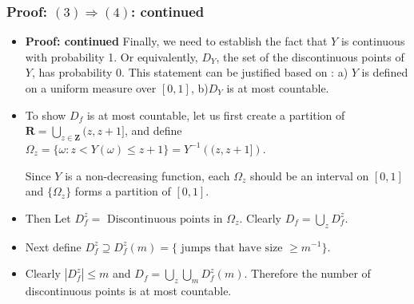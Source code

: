 \documentclass[handout]{beamer}
\begin{document}
\frame
{
  \frametitle{Proof: $(3) \Rightarrow (4)$: continued} 

   \begin{itemize}
          
                     
\item<1-> \textbf{Proof: continued} Finally, we need to establish the fact that $Y$ is continuous with probability 1. Or equivalently, $D_Y$, the set of the discontinuous points of $Y$, has probability 0. This statement can be justified based on : a) $Y$ is defined on a uniform measure over $[0,1]$, b)$D_Y$ is at most countable. 

\item<2-> To show  $D_f$ is at most countable, let us first create a partition of $\mathbf{R}=\bigcup_{z\in \mathbf{Z}} (z, z+1]$, and define $\Omega_z=\{\omega: z<Y(\omega)\leq z+1 \} = Y^{-1}\left( (z,z+1] \right)$. 

Since $Y$ is a non-decreasing function, each $\Omega_z$ should be an interval on $[0,1]$ and $\{\Omega_z\}$ forms a partition of $[0,1]$.

\item<3-> Then Let $D_f^z = \text{ Discontinuous points in } \Omega_z$. Clearly $D_f=\bigcup_z D_f^z$. 

\item<4-> Next define $D_f^z \supseteq D_f^z(m) = \{ \text{ jumps that have size } \ge m^{-1} \}$. 

\item<5-> Clearly $|D_f^z| \le m$ and $D_f = \bigcup_z \bigcup_m D_f^z(m)$. Therefore the number of discontinuous points is at most countable. 

                                               \end{itemize}
}
\end{document}
